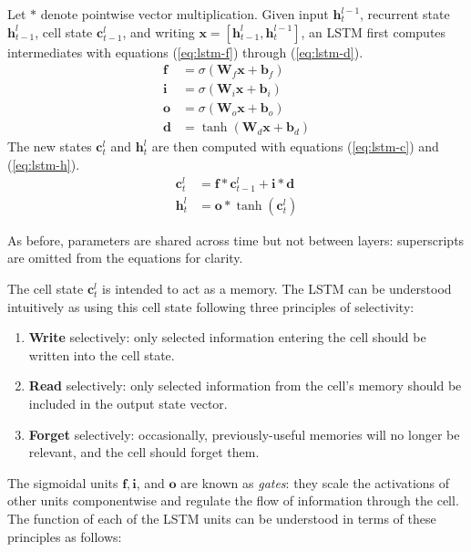 \documentclass[12pt,a4paper,twoside,openright]{report}
\newcommand{\vect}[1]{\boldsymbol{\mathbf{#1}}}
\begin{document}
Let $\ast$ denote pointwise vector multiplication. Given input
$\vect{h}_t^{l-1}$, recurrent state $\vect{h}_{t-1}^l$, cell state
$\vect{c}_{t-1}^l$, and writing $\vect{x} = [\vect{h}_{t-1}^l,
\vect{h}_t^{l-1}]$, an LSTM first computes intermediates with equations
(\ref{eq:lstm-f}) through (\ref{eq:lstm-d}).
\begin{align}
  \vect{f} &= \sigma(\vect{W}_f \vect{x} + \vect{b}_f) \label{eq:lstm-f} \\
  \vect{i} &= \sigma(\vect{W}_i \vect{x} + \vect{b}_i) \\
  \vect{o} &= \sigma(\vect{W}_o \vect{x} + \vect{b}_o) \\
  \vect{d} &= \tanh(\vect{W}_d \vect{x} + \vect{b}_d) \label{eq:lstm-d}
\end{align}
The new states $\vect{c}_t^l$ and $\vect{h}_t^l$ are then computed with
equations (\ref{eq:lstm-c}) and (\ref{eq:lstm-h}). 
\begin{align}
  \vect{c}_t^l &= \vect{f} \ast \vect{c}_{t-1}^l + \vect{i} \ast \vect{d}
  \label{eq:lstm-c} \\
  \vect{h}_t^l &= \vect{o} \ast \tanh(\vect{c}_t^l) \label{eq:lstm-h}
\end{align}

As before, parameters are shared across time but not between layers:
superscripts are omitted from the equations for clarity.

The cell state $\vect{c}_t^l$ is intended to act as a memory. The LSTM can be
understood intuitively as using this cell state following three principles of
selectivity:
\begin{enumerate}[label=\arabic*., itemsep=0mm]
  \item \textbf{Write} selectively: only selected information entering the cell
    should be written into the cell state.
  \item \textbf{Read} selectively: only selected information from the cell's
    memory should be included in the output state vector.
  \item \textbf{Forget} selectively: occasionally, previously-useful memories
    will no longer be relevant, and the cell should forget them.
\end{enumerate}

The sigmoidal units $\vect{f}, \vect{i}$, and $\vect{o}$ are known as
\emph{gates}: they scale the activations of other units componentwise and
regulate the flow of information through the cell. The function of each of the
LSTM units can be understood in terms of these principles as follows:
\end{document}
